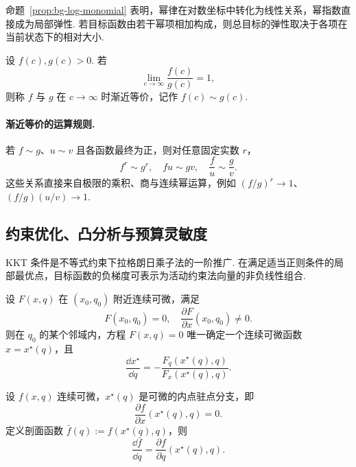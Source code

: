 命题~\ref{prop:bg-log-monomial} 表明，幂律在对数坐标中转化为线性关系，幂指数直接成为局部弹性. 若目标函数由若干幂项相加构成，则总目标的弹性取决于各项在当前状态下的相对大小. 


\begin{definition}[渐近等价]\label{def:bg-asymptotic}
设 $f(c),g(c)>0$. 若
\[
\lim_{c\to\infty}\frac{f(c)}{g(c)}=1,
\]
则称 $f$ 与 $g$ 在 $c\to\infty$ 时渐近等价，记作 $f(c)\sim g(c)$. 
\end{definition}

\paragraph{渐近等价的运算规则. \quad}
若 $f\sim g$、$u\sim v$ 且各函数最终为正，则对任意固定实数 $r$，
\begin{equation}\label{eq:bg-asymptotic-rules}
f^r\sim g^r,\quad fu\sim gv,\quad \frac{f}{u}\sim\frac{g}{v}.
\end{equation}
这些关系直接来自极限的乘积、商与连续幂运算，例如
$(f/g)^r\to1$、$(f/g)(u/v)\to1$. 


\subsection{约束优化、凸分析与预算灵敏度}\label{sec:bg-optimization}

KKT 条件是不等式约束下拉格朗日乘子法的一阶推广. 在满足适当正则条件的局部最优点，目标函数的负梯度可表示为活动约束法向量的非负线性组合. 


\begin{lemma}[简单根的隐函数形式]\label{thm:bg-implicit-simple-root}
设 $F(x,q)$ 在 $(x_0,q_0)$ 附近连续可微，满足
\[
F(x_0,q_0)=0,\quad \frac{\partial F}{\partial x}(x_0,q_0)\neq0.
\]
则在 $q_0$ 的某个邻域内，方程 $F(x,q)=0$ 唯一确定一个连续可微函数 $x=x^\star(q)$，且\cite{bonnans}
\begin{equation}\label{eq:bg-implicit-derivative}
\frac{\dd x^\star}{\dd q}
=-\frac{F_q(x^\star(q),q)}{F_x(x^\star(q),q)}.
\end{equation}
\end{lemma}

\begin{proposition}[剖面函数的一阶导数]\label{prop:bg-profile-derivative}
设 $f(x,q)$ 连续可微，$x^\star(q)$ 是可微的内点驻点分支，即
\[
\frac{\partial f}{\partial x}(x^\star(q),q)=0.
\]
定义剖面函数 $\bar f(q):=f(x^\star(q),q)$，则
\begin{equation}\label{eq:bg-profile-derivative}
\frac{\dd\bar f}{\dd q}
=\frac{\partial f}{\partial q}(x^\star(q),q).
\end{equation}
\end{proposition}


